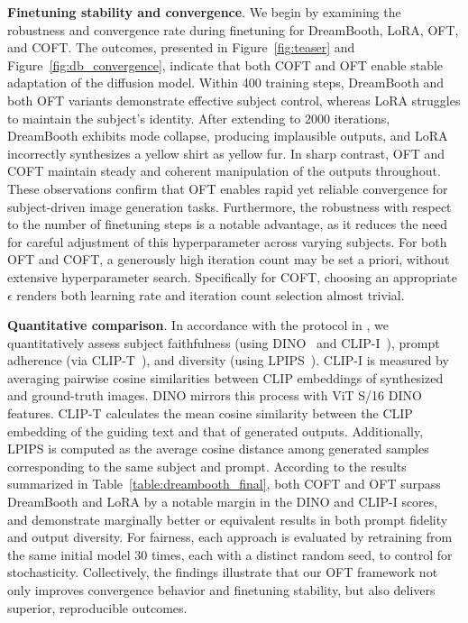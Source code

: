 \textbf{Finetuning stability and convergence}. We begin by examining the robustness and convergence rate during finetuning for DreamBooth, LoRA, OFT, and COFT. The outcomes, presented in Figure~\ref{fig:teaser} and Figure~\ref{fig:db_convergence}, indicate that both COFT and OFT enable stable adaptation of the diffusion model. Within 400 training steps, DreamBooth and both OFT variants demonstrate effective subject control, whereas LoRA struggles to maintain the subject's identity. After extending to 2000 iterations, DreamBooth exhibits mode collapse, producing implausible outputs, and LoRA incorrectly synthesizes a yellow shirt as yellow fur. In sharp contrast, OFT and COFT maintain steady and coherent manipulation of the outputs throughout. These observations confirm that OFT enables rapid yet reliable convergence for subject-driven image generation tasks. Furthermore, the robustness with respect to the number of finetuning steps is a notable advantage, as it reduces the need for careful adjustment of this hyperparameter across varying subjects. For both OFT and COFT, a generously high iteration count may be set a priori, without extensive hyperparameter search. Specifically for COFT, choosing an appropriate $\epsilon$ renders both learning rate and iteration count selection almost trivial.

\textbf{Quantitative comparison}. In accordance with the protocol in \cite{ruiz2023dreambooth}, we quantitatively assess subject faithfulness (using DINO~\cite{caron2021emerging} and CLIP-I~\cite{radford2021learning}), prompt adherence (via CLIP-T~\cite{radford2021learning}), and diversity (using LPIPS~\cite{zhang2018unreasonable}). CLIP-I is measured by averaging pairwise cosine similarities between CLIP embeddings of synthesized and ground-truth images. DINO mirrors this process with ViT S/16 DINO features. CLIP-T calculates the mean cosine similarity between the CLIP embedding of the guiding text and that of generated outputs. Additionally, LPIPS is computed as the average cosine distance among generated samples corresponding to the same subject and prompt. According to the results summarized in Table~\ref{table:dreambooth_final}, both COFT and OFT surpass DreamBooth and LoRA by a notable margin in the DINO and CLIP-I scores, and demonstrate marginally better or equivalent results in both prompt fidelity and output diversity. For fairness, each approach is evaluated by retraining from the same initial model 30 times, each with a distinct random seed, to control for stochasticity. Collectively, the findings illustrate that our OFT framework not only improves convergence behavior and finetuning stability, but also delivers superior, reproducible outcomes.

